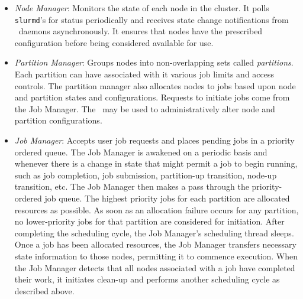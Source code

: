 \begin{itemize}
\item {\em Node Manager}: Monitors the state of each node in
the cluster.  It polls {\tt slurmd}'s for status periodically and
receives state change notifications from \slurmd\ daemons asynchronously.
It ensures that nodes have the prescribed configuration before being
considered available for use.

\item {\em Partition Manager}: Groups nodes into non-overlapping sets called
{\em partitions}. Each partition can have associated with it various job
limits and access controls.  The partition manager also allocates nodes
to jobs based upon node and partition states and configurations. Requests
to initiate jobs come from the Job Manager.  The \scontrol\ may be used
to administratively alter node and partition configurations.

\item {\em Job Manager}: Accepts user job requests and places pending
jobs in a priority ordered queue.
The Job Manager is awakened on a periodic basis and whenever there
is a change in state that might permit a job to begin running, such
as job completion, job submission, partition-up transition,
node-up transition, etc.  The Job Manager then makes a pass
through the priority-ordered job queue. The highest priority jobs
for each partition are allocated resources as possible. As soon as an
allocation failure occurs for any partition, no lower-priority jobs for
that partition are considered for initiation.
After completing the scheduling cycle, the Job Manager's scheduling
thread sleeps.  Once a job has been allocated resources, the Job Manager
transfers necessary state information to those nodes, permitting it
to commence execution.  When the Job Manager detects that
all nodes associated with a job have completed their work, it initiates
clean-up and performs another scheduling cycle as described above.

\end{itemize}
